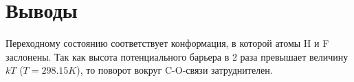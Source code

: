 \section{Выводы}
Переходному состоянию соответствует конформация, в которой атомы H и F заслонены. Так как высота потенциального барьера в 2 раза превышает величину $kT$ ($T = 298.15K$), то поворот вокруг C-O-связи затруднителен.
